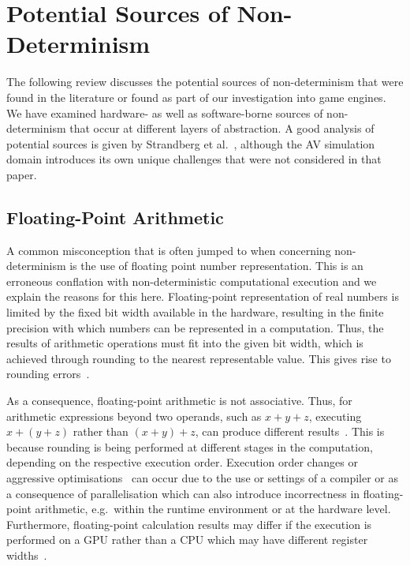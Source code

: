 \section{Potential Sources of Non-Determinism} \label{s:nondeterminisimSources}

The following review discusses the potential sources of non-determinism that were found in the literature or found as part of our investigation into game engines. We have examined hardware- as well as software-borne sources of non-determinism that occur at different layers of abstraction. 
%
A good analysis of potential sources is given by Strandberg et al.~\cite{intermittently-failing-tests}, although the AV simulation domain introduces its own unique challenges that were not considered in that paper.

\medskip

\subsection{Floating-Point Arithmetic}

A common misconception that is often jumped to when concerning non-determinism is the use of floating point number representation. This is an erroneous conflation with non-deterministic computational execution and we explain the reasons for this here. 
%
Floating-point representation of real numbers is limited by the fixed bit width available in the hardware, resulting in the finite precision with which numbers can be represented in a computation. 
Thus, the results of arithmetic operations must fit into the given bit width, which is achieved through rounding to the nearest representable value. This gives rise to rounding errors~\cite{FloatingPointsBook,goldberg1991every}. %

As a consequence, floating-point arithmetic is not associative. Thus, for arithmetic expressions beyond two operands, such as $x+y+z$, executing $x+(y+z)$ rather than $(x+y)+z$, can produce different results~\cite{Kapre2007}. This is because rounding is being performed at different stages in the computation, depending on the respective execution order. 
%
Execution order changes or aggressive optimisations~\cite{llvm-floating-point} can occur due to the use or settings of a compiler or as a consequence of parallelisation which can also introduce incorrectness in floating-point arithmetic, e.g.\ within the runtime environment or at the hardware level. 
%
Furthermore, floating-point calculation results may differ if the execution is performed on a GPU rather than a CPU which may have different register widths~\cite{Whitehead2011}. 


